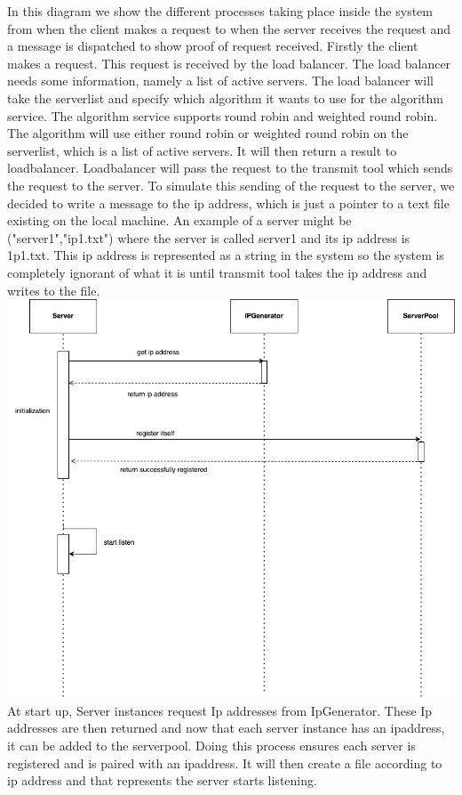 \documentclass{article}
\begin{document}
In this diagram we show the different processes taking place inside the system from when the client makes a request to when the server receives the request and a message is dispatched to show proof of request received. Firstly the client makes a request. This request is received by the load balancer. The load balancer needs some information, namely a list of active servers. The load balancer will take the serverlist and specify which algorithm it wants to use for the algorithm service. The algorithm service supports round robin and weighted round robin. The algorithm will use either round robin or weighted round robin on the serverlist, which is a list of active servers. It will then return a result to loadbalancer. Loadbalancer will pass the request to the transmit tool which sends the request to the server. To simulate this sending of the request to the server, we decided to write a message to the ip address, which is just a pointer to a text file existing on the local machine. An example of a server might be ("server1","ip1.txt") where the server is called server1 and its ip address is 1p1.txt. This ip address is represented as a string in the system so the system is completely ignorant of what it is until transmit tool takes the ip address and writes to the file. \\

\includegraphics[width=.9\textwidth, center]{initialization-seq.jpg}
At start up, Server instances request Ip addresses from IpGenerator. These Ip addresses are then returned and now that each server instance has an ipaddress, it can be added to the serverpool. Doing this process ensures each server is registered and is paired with an ipaddress. It will then create a file according to ip address and that represents the server starts listening.
\end{document}
